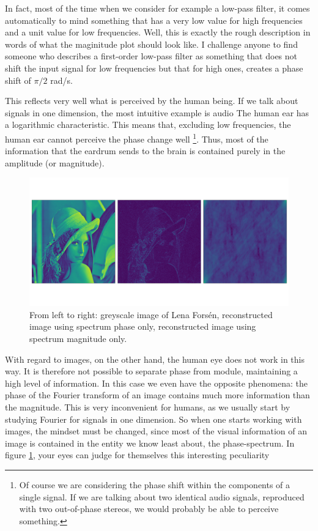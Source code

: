 In fact, most of the time when we consider for example a low-pass filter, it
comes automatically to mind something that has a very low value for high
frequencies and a unit value for low frequencies. Well, this is exactly the
rough description in words of what the maginitude plot should look like. I
challenge anyone to find someone who describes a first-order low-pass filter
as something that does not shift the input signal for low frequencies but that
for high ones, creates a phase shift of $\pi/2$ rad/s.

This reflects very well what is perceived by the human being. If we talk about
signals in one dimension, the most intuitive example is audio The human ear
has a logarithmic characteristic. This means that, excluding low frequencies,
the human ear cannot perceive the phase change well \footnote{Of course we are
considering the phase shift within the components of a single signal. If we
are talking about two identical audio signals, reproduced with two
out-of-phase stereos, we would probably be able to perceive something.}. Thus,
most of the information that the eardrum sends to the brain is contained
purely in the amplitude (or magnitude).

\begin{figure}
  \centering
  \includegraphics[width=.95\textwidth, trim=0 100 0 100, clip]{papers/kugel/figures/python/phase_vs_abs.pdf}
  \caption {
    From left to right: greyscale image of Lena Forsén, reconstructed image
    using spectrum phase only, reconstructed image using spectrum magnitude
    only.
    \label{kugel:fig:2d-fourier-phasevsmagn}
  }
\end{figure}

With regard to images, on the other hand, the human eye does not work in this
way. It is therefore not possible to separate phase from module, maintaining a
high level of information. In this case we even have the opposite phenomena:
the phase of the Fourier transform of an image contains much more information
than the magnitude. This is very inconvenient for humans, as we usually start
by studying Fourier for signals in one dimension. So when one starts working
with images, the mindset must be changed, since most of the visual information
of an image is contained in the entity we know least about, the
phase-spectrum. In figure \ref{kugel:fig:2d-fourier-phasevsmagn}, your eyes
can judge for themselves this interesting peculiarity

